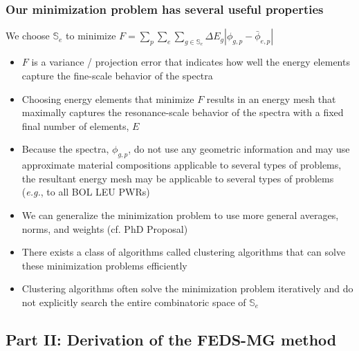 \documentclass[compress,10pt]{beamer}
\newcommand{\eg}{{\it e.g.}}
\begin{document}
\typeout{***********************************************************************************}

\begin{frame}
   \frametitle{Our minimization problem has several useful properties}

   \begin{block}{We choose $\mathbb{S}_e$ to minimize $F = \sum\limits_{p} \sum\limits_{e} \sum\limits_{g \in \mathbb{S}_e} \Delta E_g | \phi_{g,p} - \bar{\phi}_{e,p} | $}
   \begin{itemize}
       \item<1-> $F$ is a variance / projection error that indicates how well the energy elements capture the fine-scale behavior of the spectra
       \item<2-> Choosing energy elements that minimize $F$ results in an energy mesh that maximally captures the resonance-scale behavior of the spectra with a fixed final number of elements, $E$
       \item<3-> Because the spectra, $\phi_{g,p}$, do not use any geometric information and may use approximate material compositions applicable to several types of problems, the resultant energy mesh may be applicable to several types of problems (\eg, to all BOL LEU PWRs)
       \item<4-> We can generalize the minimization problem to use more general averages, norms, and weights (cf. PhD Proposal)
       \item<5-> There exists a class of algorithms called clustering algorithms that can solve these minimization problems efficiently
       \item<6-> Clustering algorithms often solve the minimization problem iteratively and do not explicitly search the entire combinatoric space of $\mathbb{S}_e$
   \end{itemize}
   \end{block}

\end{frame}

\subsection{Part II: Derivation of the FEDS-MG method}
\end{document}
